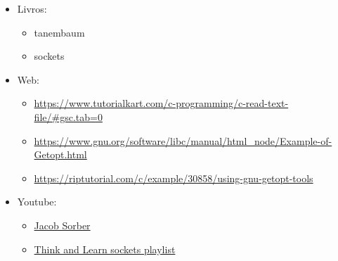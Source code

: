 \documentclass{article}
\begin{document}
\begin{itemize}
    \item Livros:
          \begin{itemize}
              \item tanembaum
              \item sockets
          \end{itemize}

    \item Web:
          \begin{itemize}
              \item
                    \url{https://www.tutorialkart.com/c-programming/c-read-text-file/#gsc.tab=0}
              \item
                    \url{https://www.gnu.org/software/libc/manual/html_node/Example-of-Getopt.html}
              \item
                    \url{https://riptutorial.com/c/example/30858/using-gnu-getopt-tools}
          \end{itemize}

    \item Youtube:
          \begin{itemize}
              \item \href{https://www.youtube.com/@JacobSorber}{Jacob Sorber}
              \item \href{https://www.youtube.com/watch?v=_lQ-3S4fJ0U&list=PLPyaR5G9aNDvs6TtdpLcVO43_jvxp4emI}{Think and Learn sockets playlist}
          \end{itemize}

\end{itemize}
\end{document}
